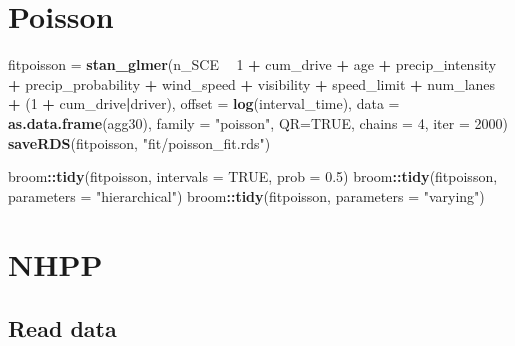 \documentclass[]{article}
\newenvironment{Shaded}{\begin{snugshade}}{\end{snugshade}}
\newcommand{\DataTypeTok}[1]{\textcolor[rgb]{0.13,0.29,0.53}{#1}}
\newcommand{\DecValTok}[1]{\textcolor[rgb]{0.00,0.00,0.81}{#1}}
\newcommand{\FloatTok}[1]{\textcolor[rgb]{0.00,0.00,0.81}{#1}}
\newcommand{\KeywordTok}[1]{\textcolor[rgb]{0.13,0.29,0.53}{\textbf{#1}}}
\newcommand{\NormalTok}[1]{#1}
\newcommand{\OperatorTok}[1]{\textcolor[rgb]{0.81,0.36,0.00}{\textbf{#1}}}
\newcommand{\OtherTok}[1]{\textcolor[rgb]{0.56,0.35,0.01}{#1}}
\newcommand{\StringTok}[1]{\textcolor[rgb]{0.31,0.60,0.02}{#1}}
\begin{document}
\hypertarget{poisson}{%
\section{Poisson}\label{poisson}}

\begin{Shaded}
\begin{Highlighting}[]
\NormalTok{fitpoisson =}\StringTok{ }\KeywordTok{stan_glmer}\NormalTok{(n_SCE }\OperatorTok{~}\StringTok{ }\DecValTok{1} \OperatorTok{+}\StringTok{ }\NormalTok{cum_drive }\OperatorTok{+}\StringTok{ }\NormalTok{age }\OperatorTok{+}\StringTok{ }
\StringTok{                          }\NormalTok{precip_intensity }\OperatorTok{+}\StringTok{ }\NormalTok{precip_probability }\OperatorTok{+}\StringTok{ }
\StringTok{                        }\NormalTok{wind_speed }\OperatorTok{+}\StringTok{ }\NormalTok{visibility }\OperatorTok{+}\StringTok{ }\NormalTok{speed_limit }\OperatorTok{+}\StringTok{ }\NormalTok{num_lanes }\OperatorTok{+}\StringTok{ }
\StringTok{                        }\NormalTok{(}\DecValTok{1} \OperatorTok{+}\StringTok{ }\NormalTok{cum_drive}\OperatorTok{|}\NormalTok{driver), }
                        \DataTypeTok{offset =} \KeywordTok{log}\NormalTok{(interval_time),}
                      \DataTypeTok{data =} \KeywordTok{as.data.frame}\NormalTok{(agg30), }
                      \DataTypeTok{family =} \StringTok{"poisson"}\NormalTok{, }
                      \DataTypeTok{QR=}\OtherTok{TRUE}\NormalTok{, }\DataTypeTok{chains =} \DecValTok{4}\NormalTok{, }\DataTypeTok{iter =} \DecValTok{2000}\NormalTok{)}
\KeywordTok{saveRDS}\NormalTok{(fitpoisson, }\StringTok{"fit/poisson_fit.rds"}\NormalTok{)}

\NormalTok{broom}\OperatorTok{::}\KeywordTok{tidy}\NormalTok{(fitpoisson, }\DataTypeTok{intervals =} \OtherTok{TRUE}\NormalTok{, }\DataTypeTok{prob =} \FloatTok{0.5}\NormalTok{)}
\NormalTok{broom}\OperatorTok{::}\KeywordTok{tidy}\NormalTok{(fitpoisson, }\DataTypeTok{parameters =} \StringTok{"hierarchical"}\NormalTok{)}
\NormalTok{broom}\OperatorTok{::}\KeywordTok{tidy}\NormalTok{(fitpoisson, }\DataTypeTok{parameters =} \StringTok{"varying"}\NormalTok{)}
\end{Highlighting}
\end{Shaded}

\hypertarget{nhpp}{%
\section{NHPP}\label{nhpp}}

\hypertarget{read-data}{%
\subsection{Read data}\label{read-data}}
\end{document}
